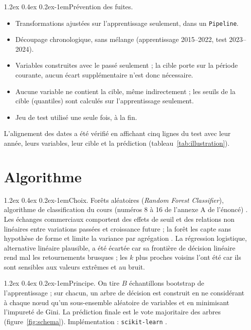 \documentclass[11pt,a4paper]{article}
\makeatletter
\renewcommand\paragraph{\@startsection{paragraph}{4}{\z@}%
  {1.2ex \@plus 0.4ex \@minus 0.2ex}{-1em}{\normalfont\normalsize\bfseries}}
\makeatother
\begin{document}
\paragraph{Prévention des fuites.}
\begin{itemize}
  \item[$\boxtimes$] Transformations ajustées sur l'apprentissage seulement, dans un \texttt{Pipeline}.
  \item[$\boxtimes$] Découpage chronologique, sans mélange (apprentissage 2015--2022, test 2023--2024).
  \item[$\boxtimes$] Variables construites avec le passé seulement ; la cible porte sur la période courante, aucun écart supplémentaire n'est donc nécessaire.
  \item[$\boxtimes$] Aucune variable ne contient la cible, même indirectement ; les seuils de la cible (quantiles) sont calculés sur l'apprentissage seulement.
  \item[$\boxtimes$] Jeu de test utilisé une seule fois, à la fin.
\end{itemize}
L'alignement des dates a été vérifié en affichant cinq lignes du test avec leur année, leurs variables, leur cible et la prédiction (tableau~\ref{tab:illustration}).

\section{Algorithme}
\label{sec:algorithme}
\paragraph{Choix.} Forêts aléatoires (\textit{Random Forest Classifier}), algorithme de classification du cours (numéros 8 à 16 de l'annexe A de l'énoncé) \cite{support}. Les échanges commerciaux comportent des effets de seuil et des relations non linéaires entre variations passées et croissance future ; la forêt les capte sans hypothèse de forme et limite la variance par agrégation \cite{etat3}. La régression logistique, alternative linéaire plausible, a été écartée car sa frontière de décision linéaire rend mal les retournements brusques ; les $k$ plus proches voisins l'ont été car ils sont sensibles aux valeurs extrêmes et au bruit.

\paragraph{Principe.} On tire $B$ échantillons bootstrap de l'apprentissage ; sur chacun, un arbre de décision est construit en ne considérant à chaque nœud qu'un sous-ensemble aléatoire de variables et en minimisant l'impureté de Gini. La prédiction finale est le vote majoritaire des arbres (figure~\ref{fig:schema}). Implémentation : \texttt{scikit-learn} \cite{sklearn}.
\end{document}
